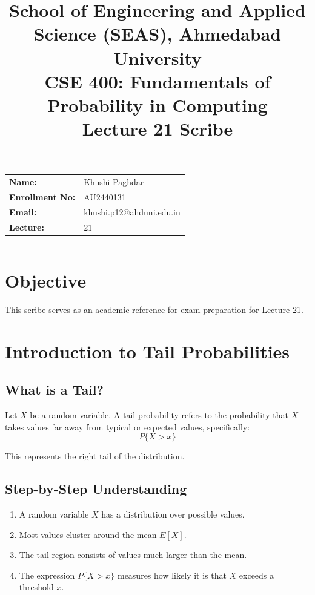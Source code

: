 \documentclass[11pt]{article}
\title{
    \normalsize School of Engineering and Applied Science (SEAS), Ahmedabad University \\
    \vspace{0.2cm}
    \textbf{CSE 400: Fundamentals of Probability in Computing}\\
    \Large Lecture 21 Scribe 
}
\author{}
\date{}
\begin{document}
\maketitle

\vspace{-2cm}
\begin{center}
    \begin{tabular}{ll}
        \textbf{Name:} & {Khushi Paghdar \hspace{2.5in}} \\ [1.5ex]
        \textbf{Enrollment No:} & {AU2440131 \hspace{2.5in}} \\ [1.5ex]
        \textbf{Email:} & {khushi.p12@ahduni.edu.in \hspace{2.1in}} \\ [1.5ex]
        \textbf{Lecture:} & {21 \hspace{2.9in}} \\ [1.5ex]
        
    \end{tabular}
\end{center}

\hrule
\vspace{0.5cm}


\section*{Objective}
This scribe serves as an academic reference for exam preparation for Lecture 21.

\section{Introduction to Tail Probabilities}

\subsection{What is a Tail?}

Let $X$ be a random variable. A tail probability refers to the probability that $X$ takes values far away from typical or expected values, specifically:
\[
P\{X > x\}
\]

This represents the right tail of the distribution.

\subsection*{Step-by-Step Understanding}
\begin{enumerate}
    \item A random variable $X$ has a distribution over possible values.
    \item Most values cluster around the mean $E[X]$.
    \item The tail region consists of values much larger than the mean.
    \item The expression $P\{X > x\}$ measures how likely it is that $X$ exceeds a threshold $x$.
\end{enumerate}
\end{document}
